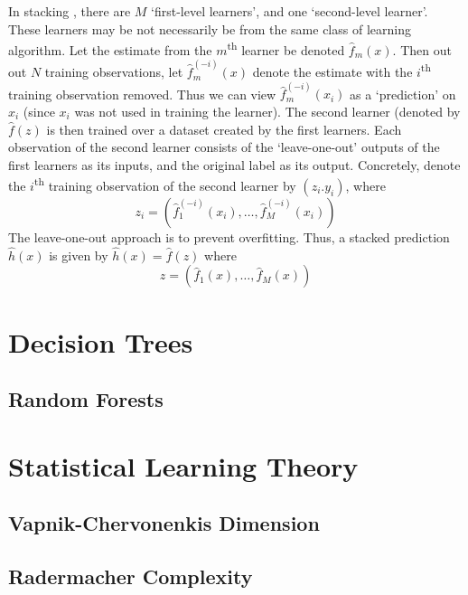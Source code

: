 \documentclass[11pt]{report} %
\begin{document}
In stacking \cite{Hastie2009, Zhou2012}, there are $M$ `first-level learners', and one `second-level learner'. These learners may be not necessarily be from the same class of learning algorithm. Let the estimate from the $m$\textsuperscript{th} learner be denoted $\hat{f}_{m}\left(x\right)$. Then out out $N$ training observations, let $\hat{f}_{m}^{\left(-i\right)}\left(x\right)$ denote the estimate with the $i$\textsuperscript{th} training observation removed. Thus we can view $\hat{f}_{m}^{\left(-i\right)}\left(x_{i}\right)$ as a `prediction' on $x_{i}$ (since $x_{i}$ was not used in training the learner). The second learner (denoted by $\hat{f}\left(z\right)$ is then trained over a dataset created by the first learners. Each observation of the second learner consists of the `leave-one-out' outputs of the first learners as its inputs, and the original label as its output. Concretely, denote the $i$\textsuperscript{th} training observation of the second learner by $\left(z_{i}. y_{i}\right)$, where
\begin{equation}
z_{i} = \left(\hat{f}_{1}^{\left(-i\right)}\left(x_{i}\right), \dots, \hat{f}_{M}^{\left(-i\right)}\left(x_{i}\right)\right)
\end{equation}
The leave-one-out approach is to prevent overfitting. Thus, a stacked prediction $\hat{h}\left(x\right)$ is given by $\hat{h}\left(x\right) = \hat{f}\left(z\right)$ where
\begin{equation}
z = \left(\hat{f}_{1}\left(x\right), \dots, \hat{f}_{M}\left(x\right)\right)
\end{equation}

\section{Decision Trees}

\subsection{Random Forests}

\section{Statistical Learning Theory}

\subsection{Vapnik-Chervonenkis Dimension}

\subsection{Radermacher Complexity}
\end{document}
